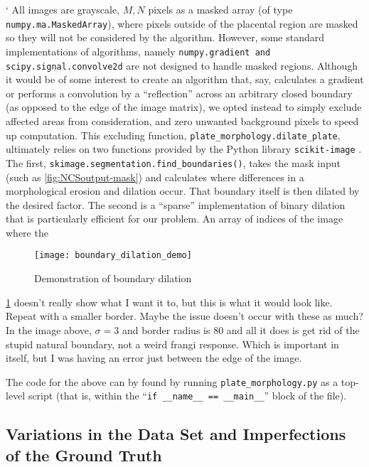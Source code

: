 `	All images are grayscale, $M,N$ pixels as a masked array (of type
	\texttt{numpy.ma.MaskedArray}), where pixels outside of the placental region are masked so they will not be considered by the algorithm. However, some standard
	implementations of algorithms, namely \texttt{numpy.gradient and scipy.signal.convolve2d} are not designed to handle masked regions. Although it would be of some interest to create an algorithm that, say, calculates a gradient or performs a convolution by a ``reflection'' across an arbitrary closed boundary (as opposed to the edge of the image matrix), we opted instead to simply exclude affected areas from consideration, and zero unwanted background pixels to speed up computation. This excluding function,
	\texttt{plate\_morphology.dilate\_plate}, ultimately relies on two functions
	provided by the Python library \texttt{scikit-image} \cite{skimage}. The first, \texttt{skimage.segmentation.find\_boundaries()}, takes the mask input (such as \cref{fig:NCSoutput-mask}) and calculates where differences in a morphological erosion and dilation occur. That boundary itself is then dilated by the desired factor. The second is a ``sparse'' implementation of binary dilation that is particularly efficient for our problem. An array of indices of the image where the 
	
	\begin{figure}  \label{fig:boundary-demo}
		\texttt{[image: boundary\_dilation\_demo]}
		\caption{Demonstration of boundary dilation}
	\end{figure}
	
	\cref{fig:boundary-demo} doesn't really show what I want it to, but this is what it would look like. Repeat with a smaller border. Maybe the issue doesn't occur with these as much? 	In the image above, $\sigma=3$ and border radius is 80 and all it does is get 	rid of the stupid natural boundary, not a weird frangi response. Which is important in itself, but I was having an error just between the edge of the image.
	
	The code for the above can by found by running \texttt{plate\_morphology.py} as a top-level script (that is, within the ``\texttt{if \_\_name\_\_ == \_\_main\_\_}'' block of the file).
	
	
	\subsection{Variations in the Data Set and Imperfections of the Ground Truth}
	
